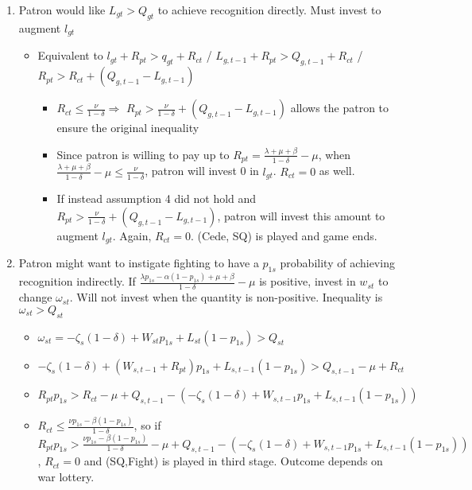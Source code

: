 \documentclass[12pt]{article}
\newcommand{\de}{\delta}
\begin{document}
						
\begin{enumerate}	
	\item Patron would like $L_{gt} > Q_{gt}$ to achieve recognition directly. Must invest to augment $l_{gt}$
		\begin{itemize}
			\item Equivalent to $l_{gt} + R_{pt} > q_{gt} + R_{ct}$ / $L_{g,t-1} + R_{pt} > Q_{g,t-1} + R_{ct}$ / $R_{pt} > R_{ct} + \left( Q_{g,t-1} - L_{g,t-1}\right)$
				\begin{itemize}
					\item $R_{ct} \leq \frac{\nu}{1-\de} \Rightarrow$ $R_{pt} > \frac{\nu}{1-\de} + \left( Q_{g,t-1} - L_{g,t-1}\right)$ allows the patron to ensure the original inequality
					\item Since patron is willing to pay up to $R_{pt} = \frac{\lambda +\mu + \beta}{1-\de} - \mu$, when $\frac{\lambda +\mu + \beta}{1-\de} -\mu \leq \frac{\nu}{1-\de}$, patron will invest 0 in $l_{gt}$. $R_{ct} = 0$ as well.
					\item If instead assumption 4 did not hold and $R_{pt} > \frac{\nu}{1-\de} + \left( Q_{g,t-1} - L_{g,t-1}\right)$, patron will invest this amount to augment $l_{gt}$. Again, $R_{ct} = 0$. (Cede, SQ) is played and game ends.
				\end{itemize}
		\end{itemize}
	\item Patron might want to instigate fighting to have a $p_{1s}$ probability of achieving recognition indirectly. If $\frac{\lambda p_{1s} - \alpha (1-p_{1s}) + \mu + \beta}{1 - \de} -\mu$ is positive, invest in $w_{st}$ to change $\omega_{st}$. Will not invest when the quantity is non-positive. Inequality is $\omega_{st} > Q_{st}$
		\begin{itemize}
			\item $\omega_{st} = -\zeta_{s}(1-\de) + W_{st}p_{1s} + L_{st}(1-p_{1s}) > Q_{st}$
			\item $-\zeta_{s}(1-\de) + (W_{s,t-1}+R_{pt})p_{1s} + L_{s,t-1}(1-p_{1s}) > Q_{s,t-1} - \mu + R_{ct}$
			\item $R_{pt}p_{1s} > R_{ct} - \mu + Q_{s,t-1} - \left(-\zeta_{s}(1-\de) + W_{s,t-1}p_{1s} + L_{s,t-1}(1-p_{1s})\right)$
			\item $R_{ct} \leq \frac{\nu p_{1s} - \beta (1-p_{1s})}{1 -\de}$, so if $R_{pt}p_{1s} > \frac{\nu p_{1s} - \beta (1-p_{1s})}{1 -\de} - \mu + Q_{s,t-1} - \left(-\zeta_{s}(1-\de) + W_{s,t-1}p_{1s} + L_{s,t-1}(1-p_{1s})\right)$, $R_{ct}=0$ and (SQ,Fight) is played in third stage. Outcome depends on war lottery.

\end{itemize}
\end{enumerate}
\end{document}
